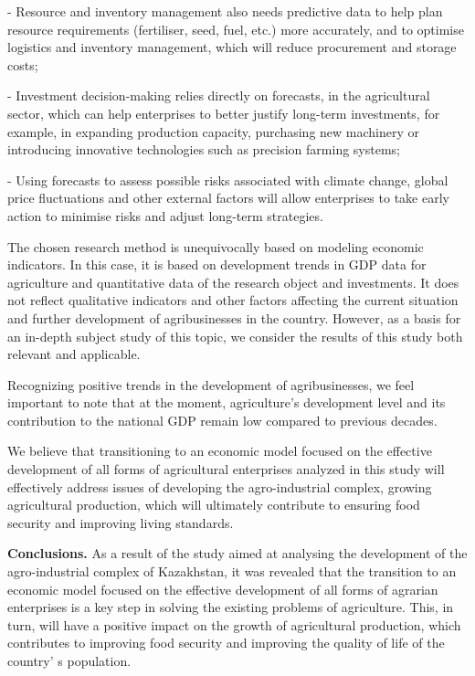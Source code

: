 \begin{multicols}{2}
- Resource and inventory management also needs predictive data to help
plan resource requirements (fertiliser, seed, fuel, etc.) more
accurately, and to optimise logistics and inventory management, which
will reduce procurement and storage costs;

- Investment decision-making relies directly on forecasts, in the
agricultural sector, which can help enterprises to better justify
long-term investments, for example, in expanding production capacity,
purchasing new machinery or introducing innovative technologies such as
precision farming systems;

- Using forecasts to assess possible risks associated with climate
change, global price fluctuations and other external factors will allow
enterprises to take early action to minimise risks and adjust long-term
strategies.

The chosen research method is unequivocally based on modeling economic
indicators. In this case, it is based on development trends in GDP data
for agriculture and quantitative data of the research object and
investments. It does not reflect qualitative indicators and other
factors affecting the current situation and further development of
agribusinesses in the country. However, as a basis for an in-depth
subject study of this topic, we consider the results of this study both
relevant and applicable.

Recognizing positive trends in the development of agribusinesses, we
feel important to note that at the moment, agriculture's development
level and its contribution to the national GDP remain low compared to
previous decades.

We believe that transitioning to an economic model focused on the
effective development of all forms of agricultural enterprises analyzed
in this study will effectively address issues of developing the
agro-industrial complex, growing agricultural production, which will
ultimately contribute to ensuring food security and improving living
standards.

{\bfseries Conclusions.} As a result of the study aimed at analysing the
development of the agro-industrial complex of Kazakhstan, it was
revealed that the transition to an economic model focused on the
effective development of all forms of agrarian enterprises is a key step
in solving the existing problems of agriculture. This, in turn, will
have a positive impact on the growth of agricultural production, which
contributes to improving food security and improving the quality of life
of the country' s population.


\end{multicols}
